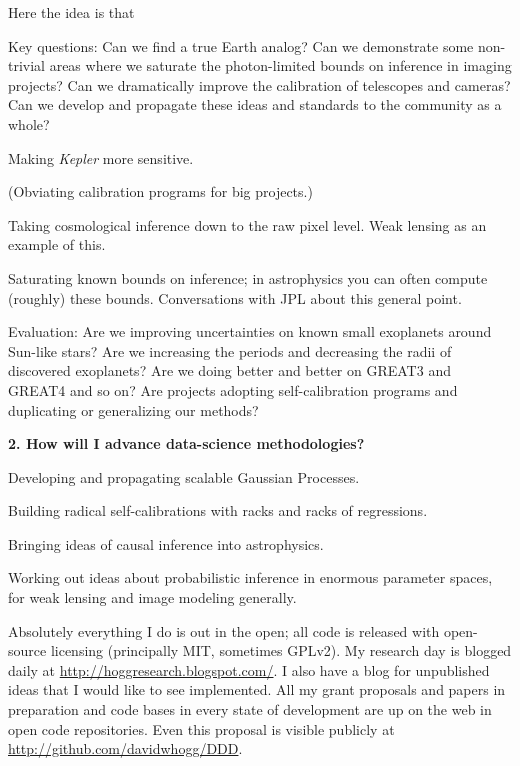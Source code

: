 \documentclass[11pt, letterpaper]{article}
\begin{document}
Here the idea is that 


Key questions: Can we find a true Earth analog?  Can we demonstrate
some non-trivial areas where we saturate the photon-limited bounds on
inference in imaging projects?  Can we dramatically improve the
calibration of telescopes and cameras?  Can we develop and propagate
these ideas and standards to the community as a whole?

Making \textsl{Kepler} more sensitive.

(Obviating calibration programs for big projects.)

Taking cosmological inference down to the raw pixel level.  Weak
lensing as an example of this.

Saturating known bounds on inference; in astrophysics you can often
compute (roughly) these bounds.  Conversations with JPL about this
general point.

Evaluation: Are we improving uncertainties on known small exoplanets
around Sun-like stars?  Are we increasing the periods and decreasing
the radii of discovered exoplanets?  Are we doing better and better on
GREAT3 and GREAT4 and so on?  Are projects adopting self-calibration
programs and duplicating or generalizing our methods?

\bigskip
\noindent\textbf{2. How will I advance data-science methodologies?}
\smallskip

Developing and propagating scalable Gaussian Processes.

Building radical self-calibrations with racks and racks of regressions.

Bringing ideas of causal inference into astrophysics.

Working out ideas about probabilistic inference in enormous parameter spaces,
for weak lensing and image modeling generally.

Absolutely everything I do is out in the open; all code is released
with open-source licensing (principally MIT, sometimes GPLv2).
My research day is blogged daily at
\url{http://hoggresearch.blogspot.com/}.
I also have a blog for unpublished ideas that I would like to see
implemented.
All my grant proposals and papers in preparation and code bases in
every state of development are up on the web in open code
repositories.
Even this proposal is visible publicly at
\url{http://github.com/davidwhogg/DDD}.
\end{document}
